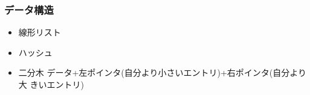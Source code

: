 \documentclass[dvipdfmx]{beamer}
\begin{document}
\begin{frame}
  \frametitle{データ構造}
  \begin{itemize}
    \item 線形リスト 
    \item ハッシュ
    \item 二分木 
          データ+左ポインタ(自分より小さいエントリ)+右ポインタ(自分より大
          きいエントリ)
  \end{itemize}
\end{frame}




\end{document}
